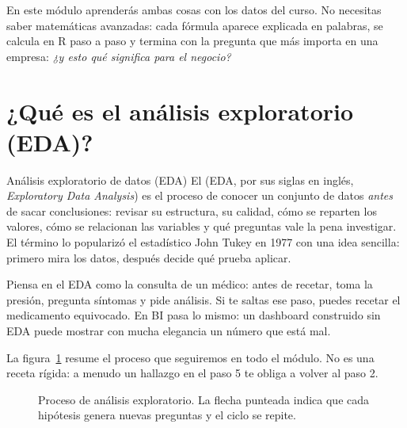 En este módulo aprenderás ambas cosas con los datos del curso. No necesitas
saber matemáticas avanzadas: cada fórmula aparece explicada en palabras, se
calcula en R paso a paso y termina con la pregunta que más importa en una
empresa: \emph{¿y esto qué significa para el negocio?}

\section{¿Qué es el análisis exploratorio (EDA)?}
\label{sec:m4-eda}

\begin{concepto}{Análisis exploratorio de datos (EDA)}
El  (EDA, por sus siglas en inglés,
\emph{Exploratory Data Analysis}) es el proceso de conocer un conjunto de
datos \emph{antes} de sacar conclusiones: revisar su estructura, su calidad,
cómo se reparten los valores, cómo se relacionan las variables y qué
preguntas vale la pena investigar. El término lo popularizó el estadístico
John Tukey en 1977 con una idea sencilla: primero mira los datos, después
decide qué prueba aplicar.
\end{concepto}

Piensa en el EDA como la consulta de un médico: antes de recetar, toma la
presión, pregunta síntomas y pide análisis. Si te saltas ese paso, puedes
recetar el medicamento equivocado. En BI pasa lo mismo: un dashboard
construido sin EDA puede mostrar con mucha elegancia un número que está mal.

La figura~\ref{fig:m4-proceso} resume el proceso que seguiremos en todo el
módulo. No es una receta rígida: a menudo un hallazgo en el paso 5 te obliga a
volver al paso 2.

\begin{figure}[H]
\centering
{}
\caption{Proceso de análisis exploratorio. La flecha punteada indica que cada
hipótesis genera nuevas preguntas y el ciclo se repite.}
\label{fig:m4-proceso}
\end{figure}

